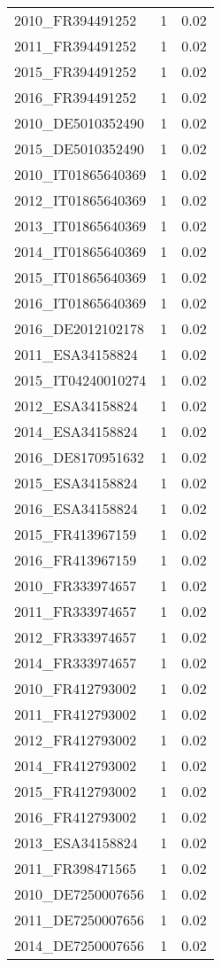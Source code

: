 \begin{table*}[htbp]
\begin{tabular}{lrr}
2010_FR394491252 & 1 & 0.02 \\
2011_FR394491252 & 1 & 0.02 \\
2015_FR394491252 & 1 & 0.02 \\
2016_FR394491252 & 1 & 0.02 \\
2010_DE5010352490 & 1 & 0.02 \\
2015_DE5010352490 & 1 & 0.02 \\
2010_IT01865640369 & 1 & 0.02 \\
2012_IT01865640369 & 1 & 0.02 \\
2013_IT01865640369 & 1 & 0.02 \\
2014_IT01865640369 & 1 & 0.02 \\
2015_IT01865640369 & 1 & 0.02 \\
2016_IT01865640369 & 1 & 0.02 \\
2016_DE2012102178 & 1 & 0.02 \\
2011_ESA34158824 & 1 & 0.02 \\
2015_IT04240010274 & 1 & 0.02 \\
2012_ESA34158824 & 1 & 0.02 \\
2014_ESA34158824 & 1 & 0.02 \\
2016_DE8170951632 & 1 & 0.02 \\
2015_ESA34158824 & 1 & 0.02 \\
2016_ESA34158824 & 1 & 0.02 \\
2015_FR413967159 & 1 & 0.02 \\
2016_FR413967159 & 1 & 0.02 \\
2010_FR333974657 & 1 & 0.02 \\
2011_FR333974657 & 1 & 0.02 \\
2012_FR333974657 & 1 & 0.02 \\
2014_FR333974657 & 1 & 0.02 \\
2010_FR412793002 & 1 & 0.02 \\
2011_FR412793002 & 1 & 0.02 \\
2012_FR412793002 & 1 & 0.02 \\
2014_FR412793002 & 1 & 0.02 \\
2015_FR412793002 & 1 & 0.02 \\
2016_FR412793002 & 1 & 0.02 \\
2013_ESA34158824 & 1 & 0.02 \\
2011_FR398471565 & 1 & 0.02 \\
2010_DE7250007656 & 1 & 0.02 \\
2011_DE7250007656 & 1 & 0.02 \\
2014_DE7250007656 & 1 & 0.02 \\

\end{tabular}
\end{table*}

